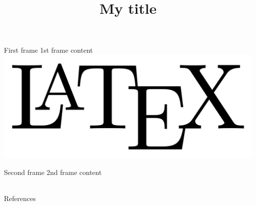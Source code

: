 \documentclass[aspectratio=169]{beamer}
\title{My title}
\begin{document}
\maketitle

\begin{frame}{First frame}
    1st frame content\\
    \includegraphics[width=.3\textwidth]{figures/LaTeX_logo.png}\\
    \cite{Mallet_2020}
\end{frame}

\begin{frame}{Second frame}
    2nd frame content\\
    \\
    \cite{10.1093/bioinformatics/btab849}
\end{frame}


\appendix
\begin{frame}[allowframebreaks]{References}


\end{frame}
\end{document}
